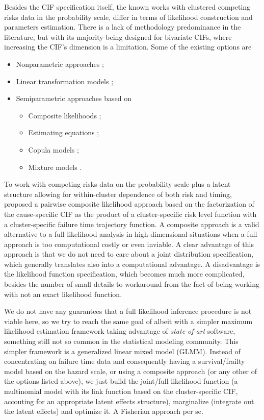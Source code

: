 Besides the CIF specification itself, the known works with clustered
competing risks data in the probability scale, differ in terms of
likelihood construction and parameters estimation. There is a lack of
methodology predominance in the literature, but with its majority being
designed for bivariate CIFs, where increasing the CIF's dimension is a
limitation. Some of the existing options are
\begin{itemize}
 \item Nonparametric approaches \cite{cheng07,cheng09};
 \item Linear transformation models \cite{fine99,gerds12};
 \item Semiparametric approaches based on
  \begin{itemize}
   \item Composite likelihoods \cite{shih,SCHEIKE};
   \item Estimating equations \cite{cheng&fine12,crossoddsratioSCHEIKE};
   \item Copula models \cite{semiparametricSCHEIKE};
   \item Mixture models \cite{naskar05,shi13}.
  \end{itemize}
\end{itemize}

To work with competing risks data on the probability scale plus a latent
structure allowing for within-cluster dependence of both risk and
timing,  proposed a pairwise composite likelihood
approach based on the factorization of the cause-specific CIF as the
product of a cluster-specific risk level function with a
cluster-specific failure time trajectory function. A composite approach
\cite{lindsay88, cox&reid04, varin11} is a valid alternative to a full
likelihood analysis in high-dimensional situations when a full approach
is too computational costly or even inviable. A clear advantage of this
approach is that we do not need to care about a joint distribution
specification, which generally translates also into a computational
advantage. A disadvantage is the likelihood function specification,
which becomes much more complicated, besides the number of small details
to workaround from the fact of being working with not an exact
likelihood function.

We do not have any guarantees that a full likelihood inference procedure
is not viable here, so we try to reach the same goal of
 albeit with a simpler maximum likelihood estimation
framework taking advantage of \textit{state-of-art} software, something
still not so common in the statistical modeling community. This simpler
framework is a generalized linear mixed model (GLMM). Instead of
concentrating on failure time data and consequently having a
survival/frailty model based on the hazard scale, or using a composite
approach (or any other of the options listed above), we just build the
joint/full likelihood function (a multinomial model with its link
function based on the cluster-specific CIF, accouting for an appropriate
latent effects structure), marginalize (integrate out the latent
effects) and optimize it. A Fisherian approach per se.

